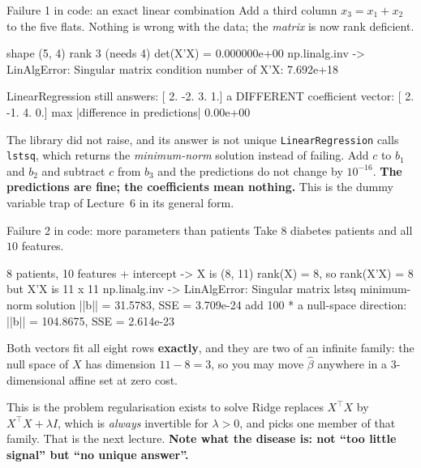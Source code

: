 \documentclass[aspectratio=169]{beamer}
\newcommand{\Xt}{X^{\!\top}}
\begin{document}
\begin{frame}[fragile,shrink=8]{Failure 1 in code: an exact linear combination}
Add a third column $x_3 = x_1 + x_2$ to the five flats. Nothing is wrong with
the data; the \emph{matrix} is now rank deficient.
\begin{outblk}
shape (5, 4)  rank 3  (needs 4)
det(X'X) = 0.000000e+00
np.linalg.inv  ->  LinAlgError: Singular matrix
condition number of X'X: 7.692e+18
\end{outblk}
\begin{outblk}
LinearRegression still answers: [ 2. -2.  3.  1.]
a DIFFERENT coefficient vector: [ 2. -1.  4.  0.]
max |difference in predictions| 0.00e+00
\end{outblk}
\begin{alertblock}{The library did not raise, and its answer is not unique}
  \footnotesize \texttt{LinearRegression} calls \texttt{lstsq}, which returns
  the \emph{minimum-norm} solution instead of failing. Add $c$ to $b_1$ and
  $b_2$ and subtract $c$ from $b_3$ and the predictions do not change by
  $10^{-16}$. \textbf{The predictions are fine; the coefficients mean
  nothing.} This is the dummy variable trap of Lecture~6 in its general form.
\end{alertblock}
\end{frame}

\begin{frame}[fragile,shrink=8]{Failure 2 in code: more parameters than patients}
Take $8$ diabetes patients and all $10$ features.
\begin{outblk}
8 patients, 10 features + intercept -> X is (8, 11)
rank(X) = 8, so rank(X'X) = 8 but X'X is 11 x 11
np.linalg.inv  ->  LinAlgError: Singular matrix
lstsq minimum-norm solution ||b|| = 31.5783, SSE = 3.709e-24
add 100 * a null-space direction: ||b|| = 104.8675, SSE = 2.614e-23
\end{outblk}
\begin{center}\small
  Both vectors fit all eight rows \textbf{exactly}, and they are two of an
  infinite family: the null space of $X$ has dimension
  $11 - 8 = 3$, so you may move $\hat\beta$ anywhere in a $3$-dimensional
  affine set at zero cost.
\end{center}
\begin{alertblock}{This is the problem regularisation exists to solve}
  \footnotesize Ridge replaces $\Xt X$ by $\Xt X + \lambda I$, which is
  \emph{always} invertible for $\lambda > 0$, and picks one member of that
  family. That is the next lecture. \textbf{Note what the disease is: not
  ``too little signal'' but ``no unique answer''.}
\end{alertblock}
\end{frame}
\end{document}
